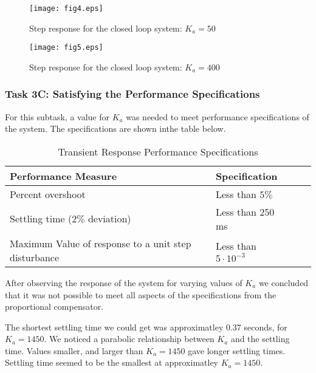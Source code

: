 \documentclass{article}
\newcommand{\matlab}[1]{%
%
}
\begin{document}
\begin{figure}[H]
  \caption{Step response for the closed loop system: $K_a = 50$}
  \centering
  \texttt{[image: fig4.eps]}
\end{figure}

\matlab{fig5.m}

\begin{figure}[H]
  \caption{Step response for the closed loop system: $K_a = 400$}
  \centering
  \texttt{[image: fig5.eps]}
\end{figure}

\subsubsection*{Task 3C: Satisfying the Performance Specifications}

For this subtask, a value for $K_a$ was needed to meet performance 
specifications of the system. The specifications are shown inthe table below.

\begin{table}[H]
\begin{center}
  \begin{tabular}{ | l | l | l | p{5cm} |}
  \hline
  \textbf{Performance Measure} & \textbf{Specification}\\ \hline 
  Percent overshoot & Less than $5\%$ \\ \hline 
  Settling time ($2\%$ deviation) & Less than 250 ms \\ \hline 
  Maximum Value of response to a unit step disturbance & Less than 
  $5\cdot10^{-3}$ \\ \hline 
 \end{tabular}
\end{center}
\caption{Transient Response Performance Specifications}
\end{table}

After observing the response of the system for varying values of $K_a$ we
concluded that it was not possible to meet all aspects of the specifications
from the proportional compensator. 

The shortest settling time we could get was approximatley 0.37 seconds, for
$K_a = 1450$. We noticed a parabolic relationship between $K_a$ and the
settling time. Values smaller, and larger than $K_a = 1450$ gave longer
settling times. Settling time seemed to be the smallest at approximatley
$K_a = 1450$.
\end{document}
